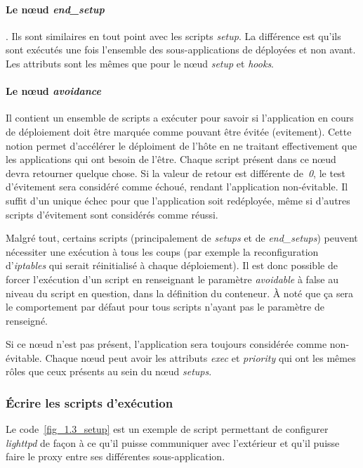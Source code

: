 \paragraph{Le nœud \emph{end\_setup}}. Ils sont similaires en tout point avec les scripts \emph{setup}. La différence est qu'ils sont exécutés une fois l'ensemble des sous-applications de déployées et non avant.
Les attributs sont les mêmes que pour le nœud \emph{setup} et \emph{hooks}.

\paragraph{Le nœud \emph{avoidance}}
Il contient un ensemble de scripts a exécuter pour savoir si l'application en cours de déploiement doit être marquée comme pouvant être évitée (\gls{evitement}).
Cette notion permet d'accélérer le déploiment de l'hôte en ne traitant effectivement que les applications qui ont besoin de l'être.
Chaque script présent dans ce nœud devra retourner quelque chose. Si la valeur de retour est différente de~\emph{0}, le test d'évitement sera considéré comme échoué, rendant l'application non-évitable.
Il suffit d'un unique échec pour que l'application soit redéployée, même si d'autres scripts d'évitement sont considérés comme réussi.

Malgré tout, certains scripts (principalement de \emph{setups} et de \emph{end\_setups}) peuvent nécessiter une exécution à tous les coups (par exemple la reconfiguration d'\emph{iptables} qui serait réinitialisé à chaque déploiement).
Il est donc possible de forcer l'exécution d'un script en renseignant le paramètre \emph{avoidable} à {false} au niveau du script en question, dans la définition du conteneur.
À noté que ça sera le comportement par défaut pour tous scripts n'ayant pas le paramètre de renseigné.

Si ce nœud n'est pas présent, l'application sera toujours considérée comme non-évitable. Chaque nœud peut avoir les attributs \emph{exec} et \emph{priority} qui ont les mêmes rôles que ceux présents au sein du nœud \emph{setups}.

\subsubsection{Écrire les scripts d'exécution}

Le code~\ref{fig_1.3_setup} est un exemple de script permettant de configurer \emph{lighttpd} de façon à ce qu'il puisse communiquer avec l'extérieur et qu'il puisse faire le proxy entre ses différentes \gls{sous-application}.

